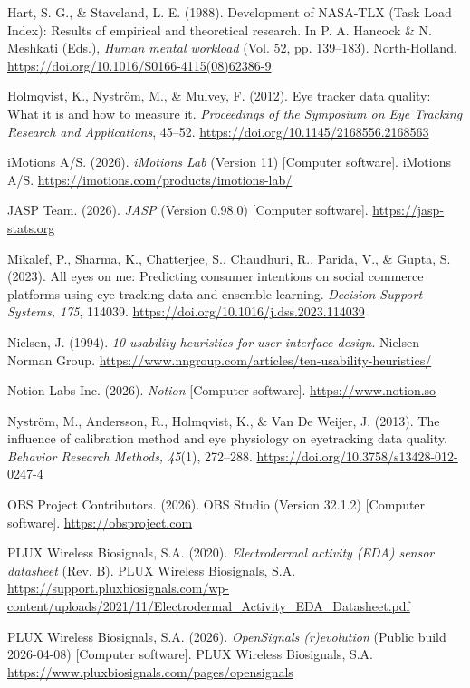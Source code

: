 \documentclass[
]{article}
\begin{document}
Hart, S. G., \& Staveland, L. E. (1988). Development of NASA-TLX (Task Load Index): Results of empirical and theoretical research. In P. A. Hancock \& N. Meshkati (Eds.), \emph{Human mental workload} (Vol. 52, pp. 139--183). North-Holland. \url{https://doi.org/10.1016/S0166-4115(08)62386-9}

Holmqvist, K., Nyström, M., \& Mulvey, F. (2012). Eye tracker data quality: What it is and how to measure it. \emph{Proceedings of the Symposium on Eye Tracking Research and Applications}, 45--52. \url{https://doi.org/10.1145/2168556.2168563}

iMotions A/S. (2026). \emph{iMotions Lab} (Version 11) {[}Computer software{]}. iMotions A/S. \url{https://imotions.com/products/imotions-lab/}

JASP Team. (2026). \emph{JASP} (Version 0.98.0) {[}Computer software{]}. \url{https://jasp-stats.org}

Mikalef, P., Sharma, K., Chatterjee, S., Chaudhuri, R., Parida, V., \& Gupta, S. (2023). All eyes on me: Predicting consumer intentions on social commerce platforms using eye-tracking data and ensemble learning. \emph{Decision Support Systems, 175}, 114039. \url{https://doi.org/10.1016/j.dss.2023.114039}

Nielsen, J. (1994). \emph{10 usability heuristics for user interface design}. Nielsen Norman Group. \url{https://www.nngroup.com/articles/ten-usability-heuristics/}

Notion Labs Inc. (2026). \emph{Notion} {[}Computer software{]}. \url{https://www.notion.so}

Nyström, M., Andersson, R., Holmqvist, K., \& Van De Weijer, J. (2013). The influence of calibration method and eye physiology on eyetracking data quality. \emph{Behavior Research Methods, 45}(1), 272--288. \url{https://doi.org/10.3758/s13428-012-0247-4}

OBS Project Contributors. (2026). OBS Studio (Version 32.1.2) {[}Computer software{]}. \url{https://obsproject.com}

PLUX Wireless Biosignals, S.A. (2020). \emph{Electrodermal activity (EDA) sensor datasheet} (Rev. B). PLUX Wireless Biosignals, S.A. \url{https://support.pluxbiosignals.com/wp-content/uploads/2021/11/Electrodermal_Activity_EDA_Datasheet.pdf}

PLUX Wireless Biosignals, S.A. (2026). \emph{OpenSignals (r)evolution} (Public build 2026-04-08) {[}Computer software{]}. PLUX Wireless Biosignals, S.A. \url{https://www.pluxbiosignals.com/pages/opensignals}
\end{document}
